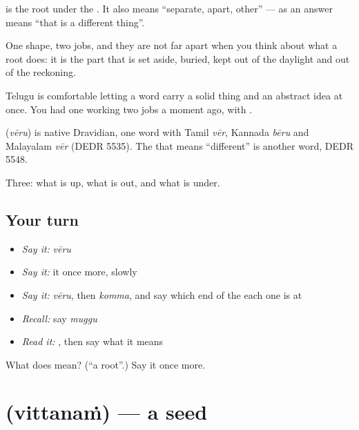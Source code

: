  is the root under the . It also means \textquotedblleft{}separate, apart, other\textquotedblright{} —  as an answer means \textquotedblleft{}that is a different thing\textquotedblright{}.

One shape, two jobs, and they are not far apart when you think about what a root does: it is the part that is set aside, buried, kept out of the daylight and out of the reckoning.

Telugu is comfortable letting a word carry a solid thing and an abstract idea at once. You had one working two jobs a moment ago, with .

\begin{cousinweb}
\textbf{} (\emph{vēru}) is native Dravidian, one word with Tamil \emph{vēr}, Kannada \emph{bēru} and Malayalam \emph{vēr} (DEDR 5535). The  that means \textquotedblleft{}different\textquotedblright{} is another word, DEDR 5548.
\end{cousinweb}

\begin{grammarlens}[title={What you've built}]
Three: what is up, what is out, and what is under.
\end{grammarlens}

\subsection*{Your turn}
\begin{itemize}
\raggedright
  \item \emph{Say it:} \emph{vēru}
  \item \emph{Say it:} it once more, slowly
  \item \emph{Say it:} \emph{vēru}, then \emph{komma}, and say which end of the  each one is at
  \item \emph{Recall:} say \emph{muggu}
  \item \emph{Read it:} \textbf{}, then say what it means
\end{itemize}

\begin{tcolorbox}[breakable,colback=teal!4,colframe=teal!35!black,title={Before you move on}]
What does  mean? (\textquotedblleft{}a root\textquotedblright{}.) Say it once more.
\end{tcolorbox}
\section[\texorpdfstring{\te{విత్తనం} (vittanaṁ)}{విత్తనం (vittanaṁ)}]{ (vittanaṁ) — a seed}

